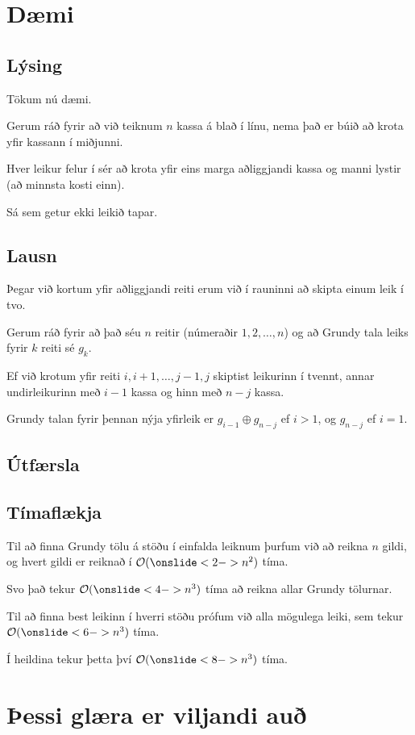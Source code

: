 \section{Dæmi}
\subsection{Lýsing}
{
    {
        \item<1-> Tökum nú dæmi.
        \item<2-> Gerum ráð fyrir að við teiknum $n$ kassa á blað í línu, nema það er búið að krota yfir kassann í miðjunni.
        \item<3-> Hver leikur felur í sér að krota yfir eins marga aðliggjandi kassa og manni lystir (að minnsta kosti einn).
        \item<4-> Sá sem getur ekki leikið tapar.
    }
}

\subsection{Lausn}
{
    {
        \item<1-> Þegar við kortum yfir aðliggjandi reiti erum við í rauninni að skipta einum leik í tvo.
        \item<2-> Gerum ráð fyrir að það séu $n$ reitir (númeraðir $1, 2, \dots, n$) og að Grundy tala leiks fyrir $k$ reiti sé $g_k$.
        \item<3-> Ef við krotum yfir reiti $i, i + 1, \dots, j - 1, j$ skiptist leikurinn í tvennt,
                    annar undirleikurinn með $i - 1$ kassa og hinn með $n - j$ kassa.
        \item<4-> Grundy talan fyrir þennan nýja yfirleik er $g_{i - 1} \oplus g_{n - j}$ ef $i > 1$,
                    og $g_{n - j}$ ef $i = 1$.
    }
}

\subsection{Útfærsla}
{
}

{
}

\subsection{Tímaflækja}
{
    {
        \item<1-> Til að finna Grundy tölu á stöðu í einfalda leiknum þurfum við að reikna $n$ gildi,
                    og hvert gildi er reiknað í $\mathcal{O}(\onslide<2->{n^2})$ tíma.
        \item<3-> Svo það tekur $\mathcal{O}(\onslide<4->{n^3})$ tíma að reikna allar Grundy tölurnar.
        \item<5-> Til að finna best leikinn í hverri stöðu prófum við alla mögulega leiki, sem tekur $\mathcal{O}(\onslide<6->{n^3})$ tíma.
        \item<7-> Í heildina tekur þetta því $\mathcal{O}(\onslide<8->{n^3})$ tíma.
    }
}

\section{Þessi glæra er viljandi auð}
{
}


